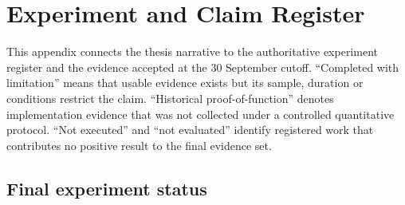 \chapter{Experiment and Claim Register}
\label{app:evidence}

This appendix connects the thesis narrative to the authoritative experiment
register and the evidence accepted at the 30 September cutoff. ``Completed with
limitation'' means that usable evidence exists but its sample, duration or
conditions restrict the claim. ``Historical proof-of-function'' denotes
implementation evidence that was not collected under a controlled quantitative
protocol. ``Not executed'' and ``not evaluated'' identify registered work that
contributes no positive result to the final evidence set.

\section{Final experiment status}


